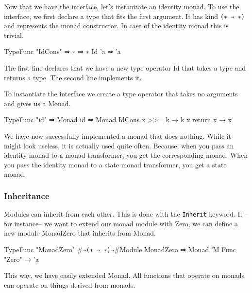 \begin{multicols}{2}
  Now that we have the interface, let's instantiate an identity monad.
  To use the interface, we first declare a type that fits the first argument.
  It has kind \verb|(∗ ⇒ ∗)| and represents the monad constructor.
  In case of the identity monad this is trivial.

  \begin{code}
  TypeFunc "IdCons" ⇒ ∗ ⇒ ∗
  Id 'a ⇒ 'a
  \end{code}

  The first line declares that we have a new type operator Id that takes a type and returns a type.
  The second line implements it. 

  To instantiate the interface we create a type operator that takes no arguments and gives us a Monad.
  
  \begin{code}
  TypeFunc "id" ⇒ Monad 
  id ⇒ Monad IdCons {
    x >>= k → k x
    return x → x
  }
  \end{code}

  We have now successfully implemented a monad that does nothing.
  While it might look useless, it is actually used quite often.
  Because, when you pass an identity monad to a monad transformer, you get the corresponding monad.
  When you pass the identity monad to a state monad transformer, you get a state monad.
\end{multicols}
\pagebreak
\begin{multicols*}{2}
  \subsubsection*{Inheritance}
  Modules can inherit from each other.
  This is done with the \verb|Inherit| keyword. 
  If --for instance-- we want to extend our monad module with Zero,
  we can define a new module MonadZero that inherits from Monad.

  \begin{code}
  TypeFunc "MonadZero" #\verb|⇒(∗ ⇒ ∗)⇒|#Module
  MonadZero ⇒ Monad 'M {
    Func "Zero" → 'a
  }
  \end{code}

  This way, we have easily extended Monad.
  All functions that operate on monads can operate on things derived from monads.
\end{multicols*}
